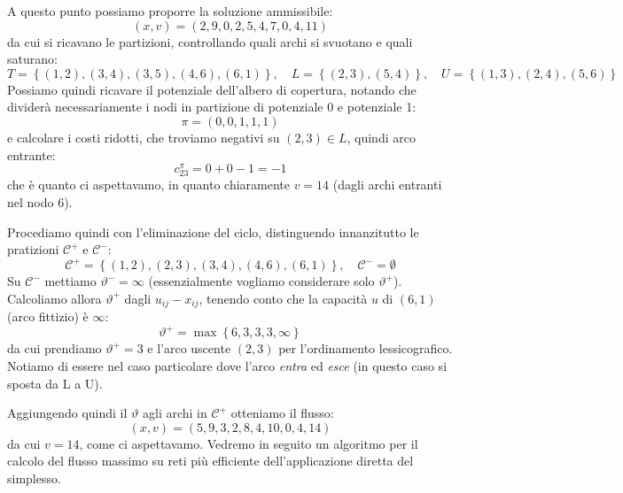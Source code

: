 \documentclass[a4paper,11pt]{article}
\begin{document}
A questo punto possiamo proporre la soluzione ammissibile:
$$
(x,v) = \left( 2, 9, 0, 2, 5, 4, 7, 0, 4, 11 \right)
$$
da cui si ricavano le partizioni, controllando quali archi si svuotano e quali saturano:
$$
T = \left\{ (1,2), (3,4), (3,5), (4,6), (6,1) \right\}, \quad L = \left\{ (2,3), (5,4) \right\}, \quad U = \left\{ (1,3), (2,4), (5,6) \right\}
$$
Possiamo quindi ricavare il potenziale dell'albero di copertura, notando che dividerà necessariamente i nodi in partizione di potenziale 0 e potenziale 1:
$$
\pi = \left( 0, 0, 1, 1 ,1 \right)
$$
e calcolare i costi ridotti, che troviamo negativi su $(2,3) \in L$, quindi arco entrante:
$$
c^\pi_{23} = 0 + 0 - 1 = -1
$$
che è quanto ci aspettavamo, in quanto chiaramente $v = 14$ (dagli archi entranti nel nodo 6).

Procediamo quindi con l'eliminazione del ciclo, distinguendo innanzitutto le pratizioni $\mathcal{C}^+$ e $\mathcal{C}^-$:
$$
\mathcal{C}^+ = \left\{ (1,2), (2,3), (3,4), (4,6), (6, 1) \right\}, \quad \mathcal{C}^- = \emptyset
$$
Su $\mathcal{C}^-$ mettiamo $\vartheta^- = \infty$ (essenzialmente vogliamo considerare solo $\vartheta^+$).
Calcoliamo allora $\vartheta^+$ dagli $u_{ij} - x_{ij}$, tenendo conto che la capacità $u$ di $(6,1)$ (arco fittizio) è $\infty$:
$$
\vartheta^+ = \max \left\{ 6, 3, 3, 3, \infty \right\}
$$
da cui prendiamo $\vartheta^+ = 3$ e l'arco uscente $(2,3)$ per l'ordinamento lessicografico.
Notiamo di essere nel caso particolare dove l'arco \textit{entra} ed \textit{esce} (in questo caso si sposta da L a U).

Aggiungendo quindi il $\vartheta$ agli archi in $\mathcal{C}^+$ otteniamo il flusso:
$$
(x, v) = \left( 5, 9, 3, 2, 8, 4, 10, 0, 4, 14 \right)
$$
da cui $v=14$, come ci aspettavamo.
Vedremo in seguito un algoritmo per il calcolo del flusso massimo su reti più efficiente dell'applicazione diretta del simplesso.
\end{document}
